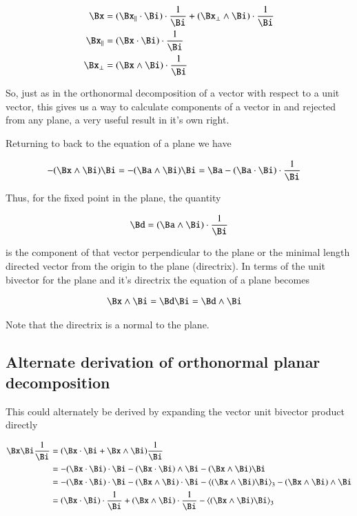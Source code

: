 \begin{align*}
\Bx 
&= 
(\Bx_\parallel \cdot \Bi) \cdot \frac{1}{\Bi} + (\Bx_\perp \wedge \Bi) \cdot \frac{1}{\Bi} \\
\Bx_\parallel &= (\Bx \cdot \Bi) \cdot \frac{1}{\Bi} \\
\Bx_\perp &= (\Bx \wedge \Bi) \cdot \frac{1}{\Bi} \\
\end{align*}

So, just as in the orthonormal decomposition of a vector with respect to a
unit vector, this gives us a way to calculate components of a vector
in and rejected from any plane, a very useful result in it's own right.

Returning to back to the equation of a plane we have

\begin{align*}
- (\Bx \wedge \Bi)\Bi &= - (\Ba \wedge \Bi)\Bi = \Ba - (\Ba \cdot \Bi) \cdot \frac{1}{\Bi}
\end{align*}

Thus, for the fixed point in the plane, the quantity

\[
\Bd = (\Ba \wedge \Bi) \cdot \frac{1}{\Bi}
\]

is the component of that vector perpendicular to the plane or the minimal length directed vector from the origin to the plane (directrix).  In terms 
of the unit bivector for the plane and it's directrix the equation of a 
plane becomes

\begin{align*}
\Bx \wedge \Bi &= \Bd \Bi = \Bd \wedge \Bi
\end{align*}

Note that the directrix is a normal to the plane.

\subsection{Alternate derivation of orthonormal planar decomposition }

This could alternately be derived by expanding the vector unit bivector
product directly

\begin{align*}
\Bx \Bi \frac{1}{\Bi} 
&= ( \Bx \cdot \Bi + \Bx \wedge \Bi ) \frac{1}{\Bi} \\
&= 
- {(\Bx \cdot \Bi) \cdot \Bi} - {(\Bx \cdot \Bi) \wedge \Bi} - {(\Bx \wedge \Bi) \Bi} \\
&= 
- {(\Bx \cdot \Bi) \cdot \Bi} - {(\Bx \wedge \Bi) \cdot \Bi } - {\left<(\Bx \wedge \Bi) \Bi\right>_3} - {(\Bx \wedge \Bi) \wedge \Bi} \\
&= 
{(\Bx \cdot \Bi) \cdot \frac{1}{\Bi}} + {(\Bx \wedge \Bi) \cdot \frac{1}{\Bi}} - {\left<(\Bx \wedge \Bi) \Bi\right>_3} \\
\end{align*}


